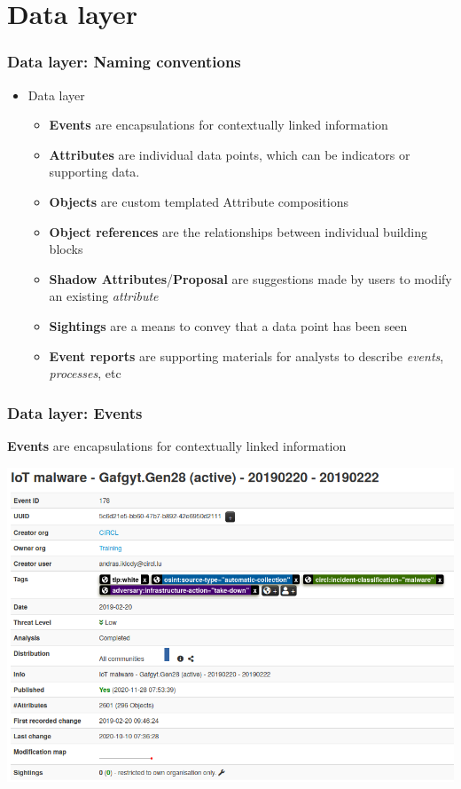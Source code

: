 \section{Data layer}
\begin{frame}
    \frametitle{Data layer: Naming conventions}
     \begin{itemize}
            \item Data layer
            \begin{itemize}
                \item {\bf Events} are encapsulations for contextually linked information
                \item {\bf Attributes} are individual data points, which can be indicators or supporting data.
                \item {\bf Objects} are custom templated Attribute compositions
                \item {\bf Object references} are the relationships between individual building blocks
                \item {\bf Shadow Attributes}/{\bf Proposal} are suggestions made by users to modify an existing {\it attribute}
                \item {\bf Sightings} are a means to convey that a data point has been seen
                \item {\bf Event reports} are supporting materials for analysts to describe {\it events}, {\it processes}, etc
            \end{itemize}
    \end{itemize}
\end{frame}

\begin{frame}[fragile]
    \frametitle{Data layer: Events}
        {\bf Events} are encapsulations for contextually linked information
        \begin{center}
            \includegraphics[width=0.9\linewidth]{screenshots/ui-event.png}
        \end{center}
\end{frame}

